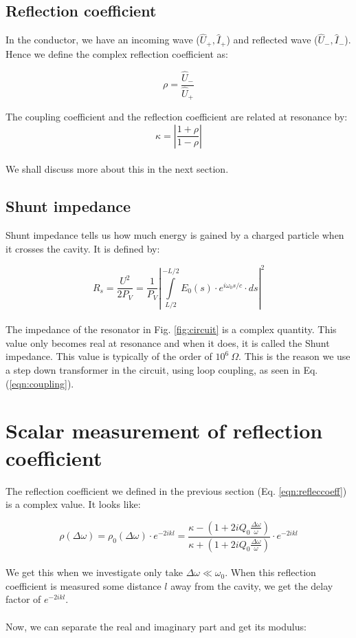 \documentclass[a4paper]{report}
\numberwithin{equation}{section}
\begin{document}
\subsection{Reflection coefficient}
In the conductor, we have an incoming wave ($\hat{U}_{+}, \hat{I}_{+}$) and
reflected wave ($\hat{U}_{-}, \hat{I}_{-}$). Hence we define the complex
reflection coefficient as:

\begin{equation} \label{eqn:refleccoeff}
		\rho = \frac{\hat{U}_{-}}{\hat{U}_{+}}
\end{equation}

The coupling coefficient and the reflection coefficient are related at resonance
by: 
\\
\begin{equation}
		\kappa = \left|\frac{1 + \rho}{1 - \rho} \right| 
\end{equation}
\\
We shall discuss more about this in the next section.

\subsection{Shunt impedance}
Shunt impedance tells us how much energy is gained by a charged particle when it
crosses the cavity. It is defined by: 

\begin{equation} \label{eqn:shunt}
		R_{s} = \frac{U^2}{2 P_{V}} = \frac{1}{P_{V}} \left|\int\limits_{L/2}^{-L/2} E_{0}\left(s \right) \cdot e^{i \omega_{0}s/c}\cdot ds \right|^2 
\end{equation}
\\
The impedance of the resonator in Fig. \ref{fig:circuit} is a complex quantity. This value only becomes real at resonance and when it does, it is called the Shunt impedance. This value is typically of the order of $10^{6} \  \Omega$. This is the reason we use a step down transformer in the circuit, using loop coupling, as seen in Eq.(\ref{eqn:coupling}). 

\section{Scalar measurement of reflection coefficient}
The reflection coefficient we defined in the previous section (Eq. \ref{eqn:refleccoeff}) is a complex value. It looks like:

\[
		\rho(\Delta \omega) = \rho_{0} (\Delta \omega) \cdot e^{-2ikl} = \frac{\kappa - \left(1 + 2iQ_{0}\frac{\Delta \omega}{\omega}\right)}{\kappa + \left(1 + 2iQ_{0}\frac{\Delta \omega}{\omega}\right)} \cdot e^{-2ikl}
\]
\\
We get this when we investigate only take $\Delta \omega \ll \omega_{0}$. When this reflection coefficient is measured some distance $l$ away from the cavity, we get the delay factor of $e^{-2ikl}$.
\\ \\
Now, we can separate the real and imaginary part and get its modulus: 
\end{document}

